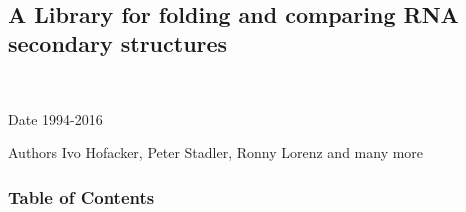 ~\newline
 

\subsection*{A Library for folding and comparing R\+NA secondary structures}



~\newline
 \begin{DoxyDate}{Date}
1994-\/2016 
\end{DoxyDate}
\begin{DoxyAuthor}{Authors}
Ivo Hofacker, Peter Stadler, Ronny Lorenz and many more
\end{DoxyAuthor}
\subsubsection*{Table of Contents}






